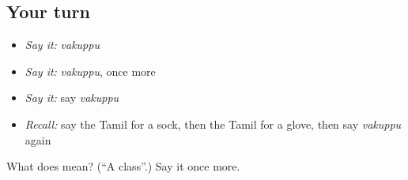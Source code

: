 \subsection*{Your turn}
\begin{itemize}
\raggedright
  \item \emph{Say it:} \emph{vakuppu}
  \item \emph{Say it:} \emph{vakuppu}, once more
  \item \emph{Say it:} say \emph{vakuppu}
  \item \emph{Recall:} say the Tamil for a sock, then the Tamil for a glove, then say \emph{vakuppu} again
\end{itemize}

\begin{tcolorbox}[breakable,colback=teal!4,colframe=teal!35!black,title={Before you move on}]
What does  mean? (\textquotedblleft{}A class\textquotedblright{}.) Say it once more.
\end{tcolorbox}
